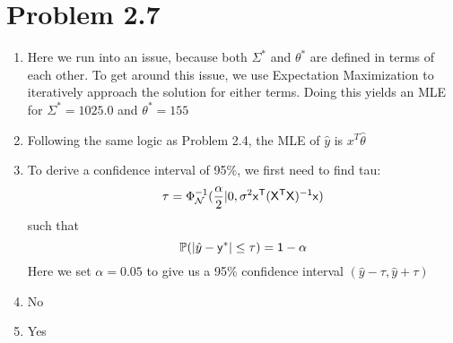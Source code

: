 \documentclass{article}
\begin{document}
\section*{Problem 2.7}
\begin{enumerate}[label=(\alph*)]
  \item Here we run into an issue, because both $\Sigma^*$ and $\theta^*$ are defined in terms of each other. To get around this issue, we use Expectation Maximization to iteratively approach the solution for either terms. Doing this yields an MLE for $\Sigma^* = 1025.0$ and $\theta^* = 155$
  \item Following the same logic as Problem 2.4, the MLE of $\hat{y}$ is $x^T\hat{\theta}$
  \item To derive a confidence interval of 95\%, we first need to find tau: \[ \tau = \Phi^{-1}_\mathcal{N}(\frac{\alpha}{2} | 0, \sigma^2\sf{x}^T(X^TX)^{-1}\sf{x})\] such that \[\mathbb{P}(|\hat{y} - \sf{y}^*| \leq \tau) = 1 - \alpha\] Here we set $\alpha = 0.05$ to give us a 95\% confidence interval $(\hat{y} - \tau, \hat{y} + \tau)$
  \item No
  \item Yes
\end{enumerate}
\end{document}

